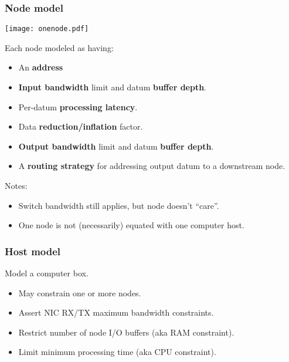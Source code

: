 \documentclass[xcolor=dvipsnames]{beamer}
\begin{document}
\begin{frame}
  \frametitle{Node model}


  \begin{center}
  \vspace{-10mm}
  \texttt{[image: onenode.pdf]}    
  \vspace{-15mm}
  \end{center}

  Each node modeled as having:
  \begin{itemize}\footnotesize
  \item An \textbf{address}
  \item \textbf{Input bandwidth} limit and datum \textbf{buffer depth}.
  \item Per-datum \textbf{processing latency}.
  \item Data \textbf{reduction/inflation} factor.
  \item \textbf{Output bandwidth} limit and datum \textbf{buffer depth}.
  \item A \textbf{routing strategy} for addressing output datum to a downstream node.
  \end{itemize}

  \footnotesize
  Notes:
  \begin{itemize}
  \item Switch bandwidth still applies, but node doesn't ``care''.
  \item One node is not (necessarily) equated with one computer host.
  \end{itemize}

\end{frame}

\begin{frame}
  \frametitle{Host model}
  Model a computer box.
  \begin{itemize}
  \item May constrain one or more nodes.
  \item Assert NIC RX/TX maximum bandwidth constraints.
  \item Restrict number of node I/O buffers (aka RAM constraint).
  \item Limit minimum processing time (aka CPU constraint).
  \end{itemize}

  

\end{frame}
\end{document}
